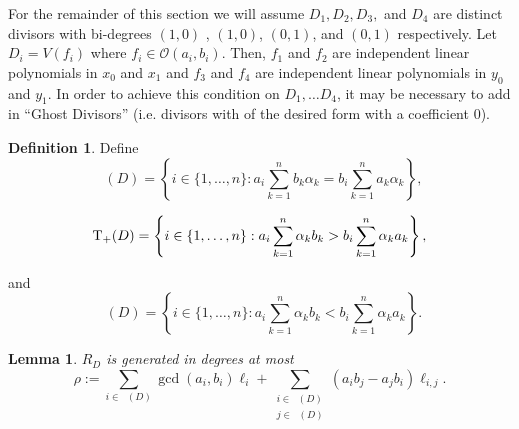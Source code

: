 \documentclass{amsart}
\theoremstyle{plain}
\newtheorem{lem}[thm]{Lemma}
\theoremstyle{definition}
\newtheorem{defn}[thm]{Definition}
\theoremstyle{remark}
\numberwithin{equation}{section}
\newcommand\sco{{\mathscr O}}
\newcommand\bida{a}
\newcommand\bidb{b}
\DeclareMathOperator{\Te}{T_=}
\DeclareMathOperator{\Tp}{T_+}
\DeclareMathOperator{\Tm}{T_-}
\begin{document}
For the remainder of this section we will assume $D_1, D_2, D_3,$ and $D_4$ are
distinct divisors with bi-degrees $(1,0)$
, $(1,0)$, $(0,1)$, and $(0,1)$ respectively. Let $D_i = V(f_i)$ where
$f_i \in \sco(\bida_i, \bidb_i)$.  
Then, $f_1$ and $f_2$ are independent linear
polynomials in $x_0$ and $x_1$ and $f_3$ and $f_4$ are independent
linear polynomials in $y_0$ and $y_1$.  In order to achieve this condition on
$D_1, \ldots D_4$, it may be necessary to add in ``Ghost Divisors'' (i.e.
divisors with of the desired form with a coefficient $0$).
\begin{defn}
Define 
\begin{equation}
\label{eqn:define-T=(D)}
	\Te(D) = \left\{i \in \{1, \ldots, n\}: \bida_i \sum_{k=1}^n \bidb_k 
\alpha_k = \bidb_i \sum_{k=1}^n \bida_k \alpha_k \right\},
\end{equation}

\begin{equation}
\label{eqn:define-T+(D)}
	\Tp(D) = \left\{ i \in \{1, \ldots, n\}:  \vphantom{\sum_{k = 1}^n} 
	\bida_i \sum_{k = 1}^n \alpha_k \bidb_k > \bidb_i \sum_{k = 1}^n \alpha_k \bida_k 
\right\},
\end{equation}

\noindent
and
\begin{equation}
\label{eqn:define-T-(D)}
	\Tm(D) = \left\{ i \in \{1, \ldots, n\}: \bida_i \sum_{k = 1}^n \alpha_k
	\bidb_k < \bidb_i \sum_{k=1}^n \alpha_k \bida_k \right\}.
\end{equation}
\end{defn}

\begin{lem}
\label{lem:hirz-generators}
$R_D$ is generated in degrees at most
\begin{equation}\label{eqn:def-sigma}
	\rho := \sum_{i \in \Te(D)} \gcd(\bida_i, \bidb_i) \ell_i + \sum_{\substack
	{i \in \Tp(D) \\ j\in \Tm(D)}} (\bida_i \bidb_j - \bida_j \bidb_i)
	\ell	_{i,j}.
\end{equation}
\end{lem}
\end{document}
